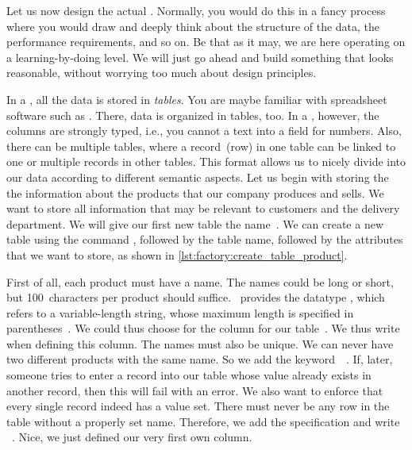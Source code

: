 %
%
\label{sec:factoryCreatingTableAndInsertingData}%
%
Let us now design the actual \db.
Normally, you would do this in a fancy process where you would draw  and deeply think about the structure of the data, the performance requirements, and so on.
Be that as it may, we are here operating on a learning-by-doing level.
We will just go ahead and build something that looks reasonable, without worrying too much about design principles.

In a , all the data is stored in \emph{tables}.
You are maybe familiar with spreadsheet software such as \microsoftExcel.
There, data is organized in tables, too.
In a , however, the columns are strongly typed, i.e., you cannot  a text into a field for numbers.
Also, there can be multiple tables, where a record~(row) in one table can be linked to one or multiple records in other tables.
This format allows us to nicely divide into our data according to different semantic aspects.%
%
%
%
Let us begin with storing the the information about the products that our company produces and sells.
We want to store all information that may be relevant to customers and the delivery department.
We will give our first new table the name~.%
%
%
%
%
%
%
We can create a new table using the command , followed by the table name, followed by the attributes that we want to store, as shown in \cref{lst:factory:create_table_product}.

First of all, each product must have a name.
The names could be long or short, but 100~characters per product should suffice.
\sql\ provides the datatype , which refers to a variable-length string, whose maximum length is specified in parentheses~\cite{PGDG:PD:CT}.
We could thus choose  for the column  for our table~.
We thus write~ when defining this column.
The names must also be unique.
We can never have two different products with the same name.
So we add the keyword~~\cite{PGDG:PD:C}.
If, later, someone tries to enter a record into our table whose  value already exists in another record, then this will fail with an error.
We also want to enforce that every single record indeed has a  value set.
There must never be any row in the table without a properly set name.
Therefore, we add the  specification and write ~\cite{PGDG:PD:C}.
Nice, we just defined our very first own column.

